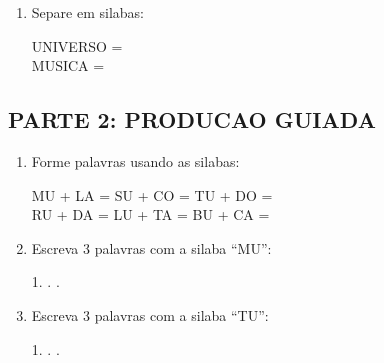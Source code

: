 \begin{exercicio}
\begin{enumerate}
  \item Separe em silabas:
  \begin{center}
  UNIVERSO = \underline{\hspace{1cm}} \underline{\hspace{1cm}} \underline{\hspace{1cm}} \underline{\hspace{1cm}}\\
  MUSICA = \underline{\hspace{1cm}} \underline{\hspace{1cm}} \underline{\hspace{1cm}}
  \end{center}
\end{enumerate}

\subsection*{PARTE 2: PRODUCAO GUIADA}

\begin{enumerate}[resume]
  \item Forme palavras usando as silabas:
  \begin{center}
  MU + LA = \underline{\hspace{2cm}} \quad SU + CO = \underline{\hspace{2cm}} \quad TU + DO = \underline{\hspace{2cm}}\\[0.5em]
  RU + DA = \underline{\hspace{2cm}} \quad LU + TA = \underline{\hspace{2cm}} \quad BU + CA = \underline{\hspace{2cm}}
  \end{center}

  \item Escreva 3 palavras com a silaba ``MU'':
  \begin{center}
  1. \underline{\hspace{3cm}} . \underline{\hspace{3cm}} . \underline{\hspace{3cm}}
  \end{center}

  \item Escreva 3 palavras com a silaba ``TU'':
  \begin{center}
  1. \underline{\hspace{3cm}} . \underline{\hspace{3cm}} . \underline{\hspace{3cm}}
  \end{center}


\end{enumerate}
\end{exercicio}
